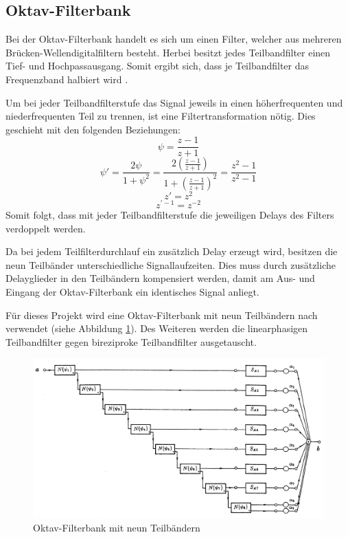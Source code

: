 \subsection{Oktav-Filterbank}
Bei der Oktav-Filterbank handelt es sich um einen Filter, welcher aus mehreren Brücken-Wellendigitalfiltern besteht. Herbei besitzt jedes Teilbandfilter einen Tief- und Hochpassausgang. Somit ergibt sich, dass je Teilbandfilter das Frequenzband halbiert wird \cite[vgl.][S. 90]{kunold1989}.\par
Um bei jeder Teilbandfilterstufe das Signal jeweils in einen höherfrequenten und niederfrequenten Teil zu trennen, ist eine Filtertransformation nötig. Dies geschieht mit den folgenden Beziehungen:
\begin{equation}
\psi = \frac{z - 1}{z + 1}
\end{equation}
\begin{equation}
\psi' = \frac{2 \psi}{1 + \psi^2} = \frac{2 \left(\frac{z - 1}{z + 1}\right)}{1 + \left(\frac{z - 1}{z + 1}\right)^2} = \frac{z^2 - 1}{z^2 - 1}
\end{equation}
\begin{equation}
z' = z^2
\end{equation}
\begin{equation}
z^{'-1} = z^{-2}
\end{equation}
Somit folgt, dass mit jeder Teilbandfilterstufe die jeweiligen Delays des Filters verdoppelt werden.\par
Da bei jedem Teilfilterdurchlauf ein zusätzlich Delay erzeugt wird, besitzen die neun Teilbänder unterschiedliche Signallaufzeiten. Dies muss durch zusätzliche Delayglieder in den Teilbändern kompensiert werden, damit am Aus- und Eingang der Oktav-Filterbank ein identisches Signal anliegt.\par
Für dieses Projekt wird eine Oktav-Filterbank mit neun Teilbändern nach \cite[][]{kunold1989} verwendet (siehe Abbildung \ref{fig:OktavFilterbank}). Des Weiteren werden die linearphasigen Teilbandfilter gegen bireziproke Teilbandfilter ausgetauscht.
\begin{figure}[h!]
	\centering	\includegraphics[width=15cm]{img/OktavFilter.png}
	\caption{Oktav-Filterbank mit neun Teilbändern \cite[][S. 95]{kunold1989}}
	\label{fig:OktavFilterbank}
\end{figure}
